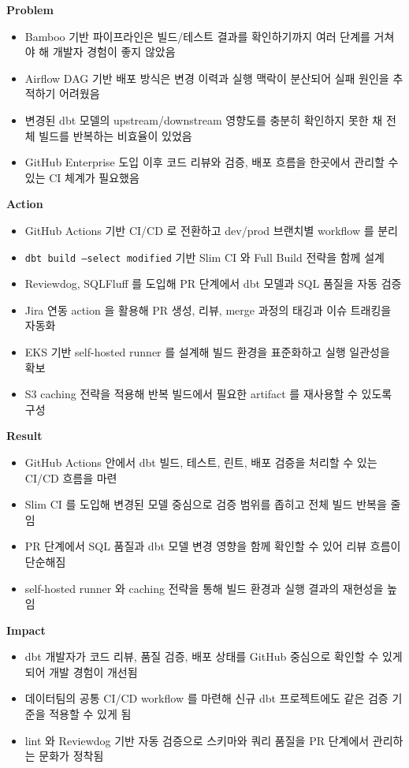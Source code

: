 \documentclass[letterpaper,11pt]{article}
\newcommand{\resumeSubProject}[2]{
  \item{
    {#1 \vspace{0pt}}
    {#2}
  }
}
\newcommand{\resumeSubBulletsStart}{%
  \begin{itemize}[leftmargin=1.5em, itemsep=2pt, topsep=2pt, label=$\circ$]%
}
\newcommand{\resumeSubBulletsEnd}{%
  \end{itemize}\vspace{-4pt}%
}
\begin{document}
  \resumeSubProject{\textbf{Problem}}{
    \resumeSubBulletsStart
      \item Bamboo 기반 파이프라인은 빌드/테스트 결과를 확인하기까지 여러 단계를 거쳐야 해 개발자 경험이 좋지 않았음
      \item Airflow DAG 기반 배포 방식은 변경 이력과 실행 맥락이 분산되어 실패 원인을 추적하기 어려웠음
      \item 변경된 dbt 모델의 upstream/downstream 영향도를 충분히 확인하지 못한 채 전체 빌드를 반복하는 비효율이 있었음
      \item GitHub Enterprise 도입 이후 코드 리뷰와 검증, 배포 흐름을 한곳에서 관리할 수 있는 CI 체계가 필요했음
    \resumeSubBulletsEnd
  }

  \resumeSubProject{\textbf{Action}}{
    \resumeSubBulletsStart
      \item GitHub Actions 기반 CI/CD 로 전환하고 dev/prod 브랜치별 workflow 를 분리
      \item \texttt{dbt build --select modified} 기반 Slim CI 와 Full Build 전략을 함께 설계
      \item Reviewdog, SQLFluff 를 도입해 PR 단계에서 dbt 모델과 SQL 품질을 자동 검증
      \item Jira 연동 action 을 활용해 PR 생성, 리뷰, merge 과정의 태깅과 이슈 트래킹을 자동화
      \item EKS 기반 self-hosted runner 를 설계해 빌드 환경을 표준화하고 실행 일관성을 확보
      \item S3 caching 전략을 적용해 반복 빌드에서 필요한 artifact 를 재사용할 수 있도록 구성
    \resumeSubBulletsEnd
  }

  \resumeSubProject{\textbf{Result}}{
    \resumeSubBulletsStart
      \item GitHub Actions 안에서 dbt 빌드, 테스트, 린트, 배포 검증을 처리할 수 있는 CI/CD 흐름을 마련
      \item Slim CI 를 도입해 변경된 모델 중심으로 검증 범위를 좁히고 전체 빌드 반복을 줄임
      \item PR 단계에서 SQL 품질과 dbt 모델 변경 영향을 함께 확인할 수 있어 리뷰 흐름이 단순해짐
      \item self-hosted runner 와 caching 전략을 통해 빌드 환경과 실행 결과의 재현성을 높임
    \resumeSubBulletsEnd
  }

  \resumeSubProject{\textbf{Impact}}{
    \resumeSubBulletsStart
      \item dbt 개발자가 코드 리뷰, 품질 검증, 배포 상태를 GitHub 중심으로 확인할 수 있게 되어 개발 경험이 개선됨
      \item 데이터팀의 공통 CI/CD workflow 를 마련해 신규 dbt 프로젝트에도 같은 검증 기준을 적용할 수 있게 됨
      \item lint 와 Reviewdog 기반 자동 검증으로 스키마와 쿼리 품질을 PR 단계에서 관리하는 문화가 정착됨
    \resumeSubBulletsEnd
  }
\end{document}
